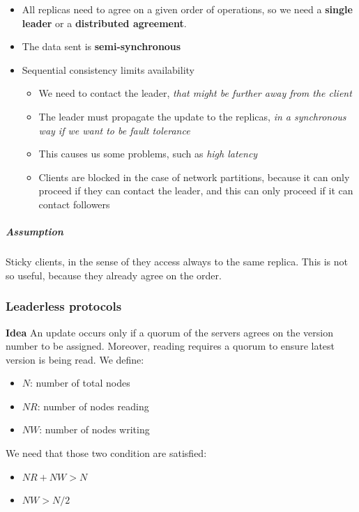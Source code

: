 \begin{itemize}
    \item
      All replicas need to agree on a given order of operations, so we need
      a \textbf{single leader} or a \textbf{distributed agreement}.
    \item
      The data sent is \textbf{semi-synchronous}
      
    \item
      Sequential consistency limits availability
    \begin{itemize}
        \item
          We need to contact the leader, \emph{that might be further away from
          the client}
        \item
          The leader must propagate the update to the replicas, \emph{in a
          synchronous way if we want to be fault tolerance}
        \item
          This causes us some problems, such as \emph{high latency}
        \item
          Clients are blocked in the case of network partitions, because it can
          only proceed if they can contact the leader, and this can only proceed
          if it can contact followers
    \end{itemize}
\end{itemize}

\subparagraph{Assumption}
Sticky clients, in the sense of they access always to the same
replica. This is not so useful, because they already agree on the
order.

\subsubsection{Leaderless protocols}

\textbf{Idea} An update occurs only if a quorum of the servers agrees on
the version number to be assigned.
Moreover, reading requires a quorum to ensure latest version is being
read.
We define:
\begin{itemize}
    \item
      $N$: number of total nodes
    \item
      $NR$: number of nodes reading
    \item
      $NW$: number of nodes writing
\end{itemize}
We need that those two condition are satisfied:
\begin{itemize}
    \item
      $NR + NW \gt N$
    \item
      $NW \gt N/2$
\end{itemize}


